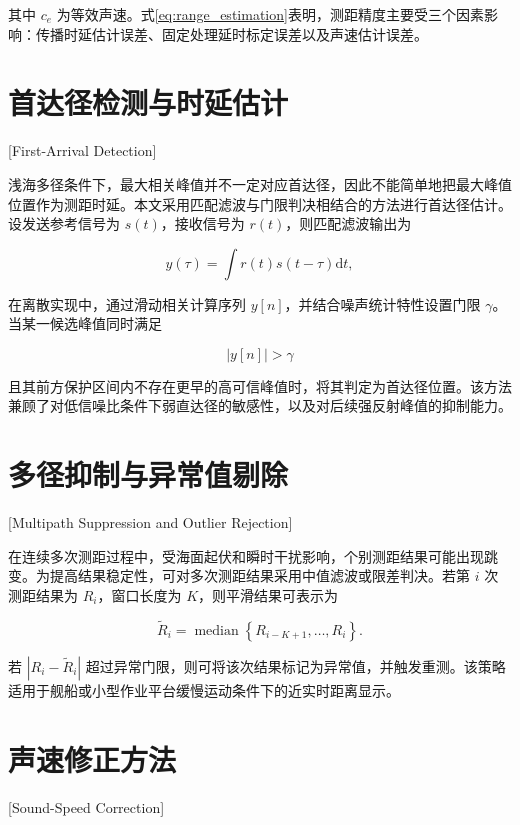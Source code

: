 其中 $c_e$ 为等效声速。式\eqref{eq:range_estimation}表明，测距精度主要受三个因素影响：传播时延估计误差、固定处理延时标定误差以及声速估计误差。

\section{首达径检测与时延估计}[First-Arrival Detection]

浅海多径条件下，最大相关峰值并不一定对应首达径，因此不能简单地把最大峰值位置作为测距时延。本文采用匹配滤波与门限判决相结合的方法进行首达径估计。设发送参考信号为 $s(t)$，接收信号为 $r(t)$，则匹配滤波输出为

\begin{equation}
  y(\tau) = \int r(t)s(t-\tau)\mathrm{d}t,
  \label{eq:mf_output}
\end{equation}

在离散实现中，通过滑动相关计算序列 $y[n]$，并结合噪声统计特性设置门限 $\gamma$。当某一候选峰值同时满足

\begin{equation}
  |y[n]| > \gamma
\end{equation}

且其前方保护区间内不存在更早的高可信峰值时，将其判定为首达径位置。该方法兼顾了对低信噪比条件下弱直达径的敏感性，以及对后续强反射峰值的抑制能力\cite{HaoMengHuaJiYuQianHaiDuoJingShiYanDeFuHeMaShuiShengCeJuYanJiu2020}。

\section{多径抑制与异常值剔除}[Multipath Suppression and Outlier Rejection]

在连续多次测距过程中，受海面起伏和瞬时干扰影响，个别测距结果可能出现跳变。为提高结果稳定性，可对多次测距结果采用中值滤波或限差判决。若第 $i$ 次测距结果为 $R_i$，窗口长度为 $K$，则平滑结果可表示为

\begin{equation}
  \tilde{R}_i = \operatorname{median}\left\{R_{i-K+1}, \ldots, R_i\right\}.
\end{equation}

若 $|R_i - \tilde{R}_i|$ 超过异常门限，则可将该次结果标记为异常值，并触发重测。该策略适用于舰船或小型作业平台缓慢运动条件下的近实时距离显示。

\section{声速修正方法}[Sound-Speed Correction]

